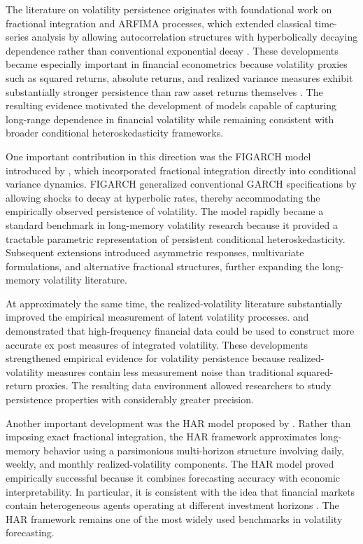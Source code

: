\documentclass[jrfm,article,submit,moreauthors,pdftex]{Definitions/mdpi}
\begin{document}
The literature on volatility persistence originates with foundational work
on fractional integration and ARFIMA processes, which extended classical
time-series analysis by allowing autocorrelation structures with
hyperbolically decaying dependence rather than conventional exponential
decay \citep{granger1980introduction,hosking1981fractional}. These
developments became especially important in financial econometrics because
volatility proxies such as squared returns, absolute returns, and realized
variance measures exhibit substantially stronger persistence than raw asset
returns themselves \citep{ding1993long}. The resulting evidence motivated
the development of models capable of capturing long-range dependence in
financial volatility while remaining consistent with broader conditional
heteroskedasticity frameworks.

One important contribution in this direction was the FIGARCH model
introduced by \citet{baillie1996fractionally}, which incorporated
fractional integration directly into conditional variance dynamics.
FIGARCH generalized conventional GARCH specifications by allowing shocks to
decay at hyperbolic rates, thereby accommodating the empirically observed
persistence of volatility. The model rapidly became a standard benchmark in
long-memory volatility research because it provided a tractable parametric
representation of persistent conditional heteroskedasticity. Subsequent
extensions introduced asymmetric responses, multivariate formulations, and
alternative fractional structures, further expanding the long-memory
volatility literature.

At approximately the same time, the realized-volatility literature
substantially improved the empirical measurement of latent volatility
processes. \citet{andersen2003modeling} and \citet{barndorff2002econometric}
demonstrated that high-frequency financial data could be used to construct
more accurate ex post measures of integrated volatility. These developments
strengthened empirical evidence for volatility persistence because
realized-volatility measures contain less measurement noise than traditional
squared-return proxies. The resulting data environment allowed researchers
to study persistence properties with considerably greater precision.

Another important development was the HAR model proposed by
\citet{corsi2009simple}. Rather than imposing exact fractional integration,
the HAR framework approximates long-memory behavior using a parsimonious
multi-horizon structure involving daily, weekly, and monthly
realized-volatility components. The HAR model proved empirically successful
because it combines forecasting accuracy with economic interpretability. In
particular, it is consistent with the idea that financial markets contain
heterogeneous agents operating at different investment horizons
\citep{muller1997volatilities}. The HAR framework remains one of the most
widely used benchmarks in volatility forecasting.
\end{document}
